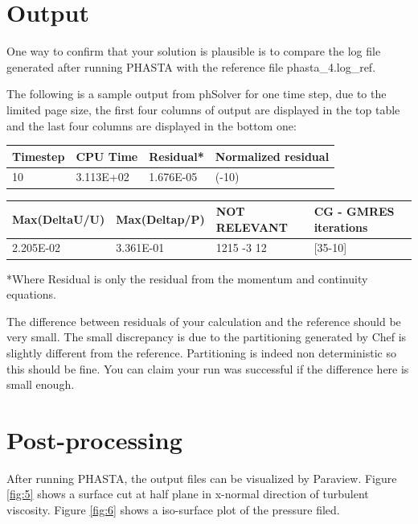 \documentclass{article}
\begin{document}
\section{Output}

One way to confirm that your solution is plausible is to compare the log file generated after running PHASTA with the reference file phasta\_4.log\_ref.

The following is a sample output from phSolver for one time step, due to the limited page size, the first four columns of output are displayed in the top table and the last four columns are displayed in the bottom one:
\begin{center}
\begin{tabular}{| l | l | l | l |}
\hline
Timestep & CPU Time & Residual* & Normalized residual \\ \hline
10 & 3.113E+02 & 1.676E-05 & (-10) \\ 
\hline
\end{tabular}
\end{center}

\begin{center}
\begin{tabular}{| l | l | l | l |}
\hline
Max(DeltaU/U) & Max(Deltap/P) & NOT RELEVANT& CG - GMRES iterations\\ \hline
2.205E-02 & 3.361E-01 & 1215 -3 12 & [35-10] \\
\hline
\end{tabular}
\end{center}

*Where Residual is only the residual from the momentum and continuity equations.

The difference between residuals of your calculation and the reference should be very small. The small discrepancy is due to the partitioning generated by Chef is slightly different from the reference. Partitioning is indeed non deterministic so this should be fine. You can claim your run was successful if the difference here is small enough.

\section{Post-processing}

After running PHASTA, the output files can be visualized by Paraview. Figure \ref{fig:5} shows a surface cut at half plane in x-normal direction of turbulent viscosity. Figure \ref{fig:6} shows a iso-surface plot of the pressure filed.
\end{document}
